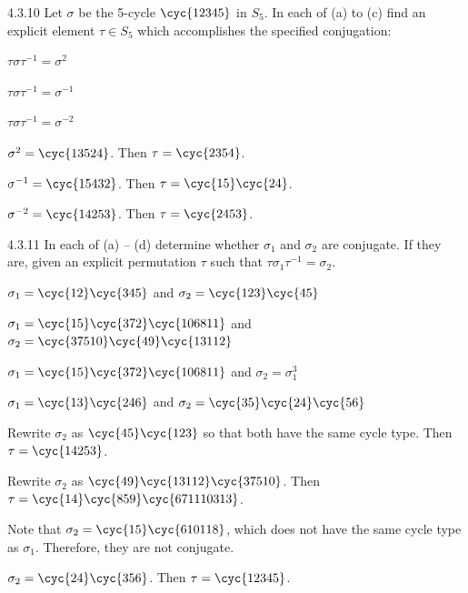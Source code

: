 \begin{exercise}{4.3.10}
	Let $\sigma$ be the 5-cycle $\cyc{1 2 3 4 5}$ in $S_5$.
	In each of (a) to (c) find an explicit element $\tau \in S_5$ which accomplishes the specified conjugation:
	\begin{subexercises}
		\item $\tau \sigma \tau^{-1} = \sigma^2$
		\item $\tau \sigma \tau^{-1} = \sigma^{-1}$
		\item $\tau \sigma \tau^{-1} = \sigma^{-2}$
	\end{subexercises}
\end{exercise}

\begin{solenum}
	\item $\sigma^2 = \cyc{1 3 5 2 4}$.
	Then $\tau = \cyc{2 3 5 4}$.
	\item $\sigma^{-1} = \cyc{1 5 4 3 2}$.
	Then $\tau = \cyc{1 5}\cyc{2 4}$.
	\item $\sigma^{-2} = \cyc{1 4 2 5 3}$.
	Then $\tau = \cyc{2 4 5 3}$.
\end{solenum}

\begin{exercise}{4.3.11}
	In each of (a) -- (d) determine whether $\sigma_1$ and $\sigma_2$ are conjugate.
	If they are, given an explicit permutation $\tau$ such that $\tau \sigma_1 \tau^{-1} = \sigma_2$.
	\begin{subexercises}
		\item $\sigma_1 = \cyc{1 2}\cyc{3 4 5}$ and $\sigma_2 = \cyc{1 2 3}\cyc{4 5}$
		\item $\sigma_1 = \cyc{1 5}\cyc{3 7 2}\cyc{10 6 8 11}$ and $\sigma_2 = \cyc{3 7 5 10}\cyc{4 9}\cyc{13 11 2}$
		\item $\sigma_1 = \cyc{1 5}\cyc{3 7 2}\cyc{10 6 8 11}$ and $\sigma_2 = \sigma_1^3$
		\item $\sigma_1 = \cyc{1 3}\cyc{2 4 6}$ and $\sigma_2 = \cyc{3 5}\cyc{2 4}\cyc{5 6}$
	\end{subexercises}
\end{exercise}

\begin{solenum}
	\item Rewrite $\sigma_2$ as $\cyc{4 5}\cyc{1 2 3}$ so that both have the same cycle type.
	Then $\tau = \cyc{1 4 2 5 3}$.
	\item Rewrite $\sigma_2$ as $\cyc{4 9}\cyc{13 11 2}\cyc{3 7 5 10}$.
	Then $\tau = \cyc{1 4}\cyc{8 5 9}\cyc{6 7 11 10 3 13}$.
	\item Note that $\sigma_2 = \cyc{1 5}\cyc{6 10 11 8}$, which does not have the same cycle type as $\sigma_1$.
	Therefore, they are not conjugate.
	\item $\sigma_2 = \cyc{2 4}\cyc{3 5 6}$.
	Then $\tau = \cyc{1 2 3 4 5}$.
\end{solenum}

